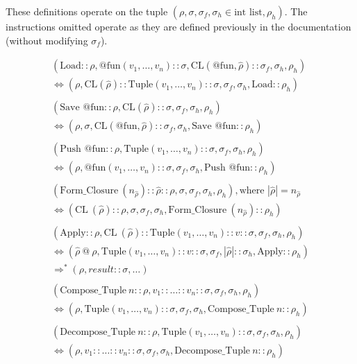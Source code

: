 \documentclass[11pt]{article}
\begin{document}
These definitions operate on the tuple $(\rho, \sigma, \sigma_f, \sigma_h \in \text{int list}, \rho_h)$. The instructions omitted operate as they are defined previously in the documentation (without modifying $\sigma_f$).  

\begin{gather*}
    (\text{Load}::\rho, \text{@fun}(v_1, \dots, v_n)::\sigma, \text{CL}(\text{@fun}, \hat{\rho})::\sigma_f, \sigma_h, \rho_h)\\
    \Longleftrightarrow (\rho, \text{CL}(\hat{\rho}):: \text{Tuple}(v_1, \dots, v_n)::\sigma, \sigma_f, \sigma_h, \text{Load}::\rho_h)\\ \\
    (\text{Save @fun}::\rho, \text{CL}(\hat{\rho})::\sigma, \sigma_f, \sigma_h, \rho_h)\\
    \Longleftrightarrow (\rho, \sigma, \text{CL}(\text{@fun}, \hat{\rho})::\sigma_f, \sigma_h, \text{Save @fun}::\rho_h)\\ \\
    (\text{Push @fun}::\rho, \text{Tuple}(v_1, \dots, v_n)::\sigma, \sigma_f, \sigma_h, \rho_h)\\
    \Longleftrightarrow (\rho, \text{@fun}(v_1, \dots, v_n)::\sigma, \sigma_f, \sigma_h, \text{Push @fun}::\rho_h)\\ \\
    (\text{Form\_Closure}\ (n_{\hat{\rho}})::\hat{\rho}::\rho, \sigma, \sigma_f, \sigma_h, \rho_h), \text{where $|\hat{\rho}| = n_{\hat{\rho}}$}\\
    \Longleftrightarrow (\text{CL}\ (\hat{\rho}) :: \rho, \sigma, \sigma_f, \sigma_h, \text{Form\_Closure}\ (n_{\hat{\rho}})::\rho_h)\\ \\
    (\text{Apply}::\rho, \text{CL}\ (\hat{\rho}):: \text{Tuple}(v_1, \dots, v_n)::v::\sigma, \sigma_f, \sigma_h, \rho_h) \\
    \Longleftrightarrow (\hat{\rho}\ @\ \rho, \text{Tuple}(v_1, \dots, v_n)::v::\sigma, \sigma_f, |\hat{\rho}|::\sigma_h, \text{Apply}::\rho_h)\\
    \Longrightarrow^* (\rho, result::\sigma, \dots)\\ \\
    (\text{Compose\_Tuple}\ n::\rho, v_1:: \dots:: v_n::\sigma, \sigma_f, \sigma_h, \rho_h)\\
    \Longleftrightarrow (\rho, \text{Tuple}(v_1, \dots, v_n)::\sigma, \sigma_f, \sigma_h, \text{Compose\_Tuple}\ n::\rho_h)\\ \\
    (\text{Decompose\_Tuple}\ n::\rho, \text{Tuple}(v_1, \dots, v_n)::\sigma, \sigma_f, \sigma_h, \rho_h)\\
    \Longleftrightarrow (\rho, v_1::\dots::v_n::\sigma, \sigma_f, \sigma_h, \text{Decompose\_Tuple}\ n::\rho_h)\\ \\
\end{gather*}
\end{document}
